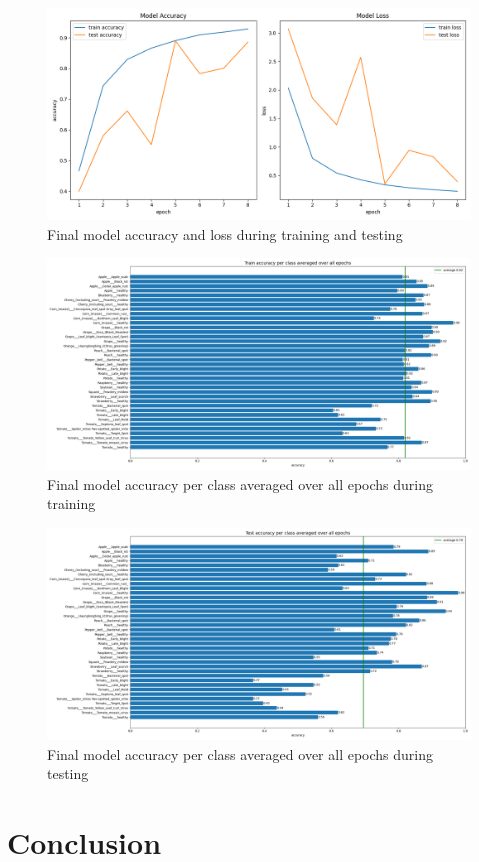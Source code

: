 \documentclass{BachelorBUI}
\begin{document}
    \begin{figure}[h]
        \centering
        \includegraphics[width=\textwidth]{final_accuracy_and_loss_2024-11-25_11.16.13.png}
        \caption{\centering Final model accuracy and loss during training and testing}
        \label{fig:final_accuracy_and_loss}
    \end{figure}
    \begin{figure}[h]
        \centering
        \includegraphics[width=\textwidth]{final_train_accuracy_per_class_2024-11-25_11.16.13.png}
        \caption{\centering Final model accuracy per class averaged over all epochs during training}
        \label{fig:final_train_accuracy_per_class}
    \end{figure}
    \begin{figure}[h]
        \centering
        \includegraphics[width=\textwidth]{final_test_accuracy_per_class_2024-11-25_11.16.14.png}
        \caption{\centering Final model accuracy per class averaged over all epochs during testing}
        \label{fig:final_test_accuracy_per_class}
    \end{figure}



\section{Conclusion}

\clearpage
\printbibliography
\end{document}
